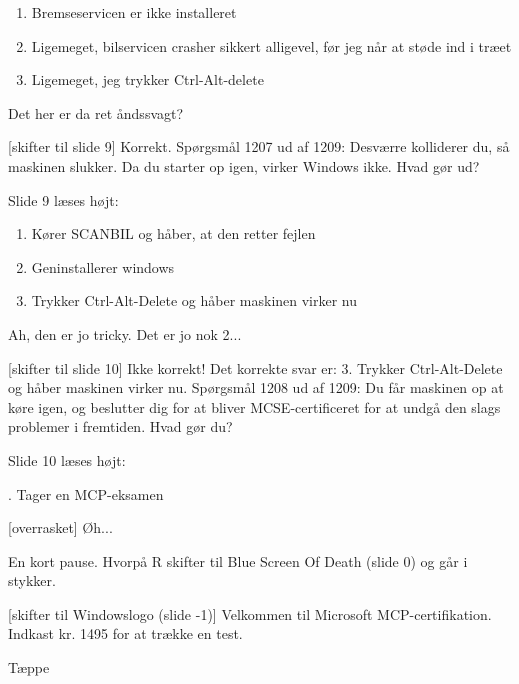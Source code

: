 \documentclass[danish]{article}
\begin{document}
\begin{sketch}
\begin{enumerate}
\item Bremseservicen er ikke installeret
\item Ligemeget, bilservicen crasher sikkert alligevel, før jeg når at støde ind
  i træet
\item Ligemeget, jeg trykker Ctrl-Alt-delete
\end{enumerate}

 Det her er da ret åndssvagt? 

[skifter til slide 9] Korrekt. Spørgsmål 1207 ud af 1209: Desværre
kolliderer du, så maskinen slukker. Da du starter op igen, virker Windows ikke.
Hvad gør ud? 

\scene Slide 9 læses højt:

\begin{enumerate}
\item Kører SCANBIL og håber, at den retter fejlen
\item Geninstallerer windows
\item Trykker Ctrl-Alt-Delete og håber maskinen virker nu
\end{enumerate}

 Ah, den er jo tricky. Det er jo nok 2... 

[skifter til slide 10] Ikke korrekt! Det korrekte svar er: 3. Trykker
Ctrl-Alt-Delete og håber maskinen virker nu. Spørgsmål 1208 ud af 1209: Du får
maskinen op at køre igen, og beslutter dig for at bliver MCSE-certificeret for
at undgå den slags problemer i fremtiden. Hvad gør du? 

\scene Slide 10 læses højt:

. Tager en MCP-eksamen

[overrasket] Øh... 

\scene En kort pause. Hvorpå R skifter til Blue Screen Of Death (slide 0) og går
i stykker.

[skifter til Windowslogo (slide -1)] Velkommen til Microsoft MCP-certifikation.
Indkast kr. 1495 for at trække en test.

\scene Tæppe

\end{sketch}
\end{document}
